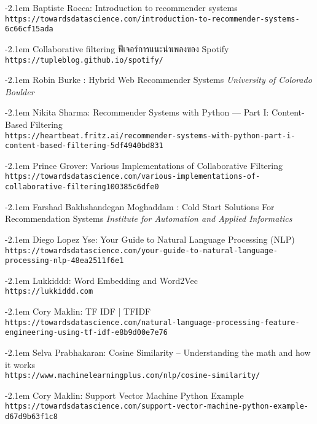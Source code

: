 \documentclass{itkmitlcoop}
\makeatletter
\def\bibindent{2.1em}
\let\old@bibitem\bibitem
\def\bibitem#1{\old@bibitem{#1}\leavevmode\kern-\bibindent}
\makeatother
\begin{document}
\begin{thebibliography}{9}
  
  Baptiste Rocca: Introduction to recommender systems
  \\\texttt{https://towardsdatascience.com/introduction-to-recommender-systems-6c66cf15ada}

  Collaborative filtering ฟีเจอร์การแนะนำเพลงของ Spotify
  \\\texttt{https://tupleblog.github.io/spotify/}  

  Robin Burke : Hybrid Web Recommender Systems
  \textit{University of Colorado Boulder}

  Nikita Sharma: Recommender Systems with Python — Part I: Content-Based Filtering
  \\\texttt{https://heartbeat.fritz.ai/recommender-systems-with-python-part-i-content-based-filtering-5df4940bd831}

  Prince Grover: Various Implementations of Collaborative Filtering
  \\\texttt{https://towardsdatascience.com/various-implementations-of-collaborative-filtering100385c6dfe0}

  Farshad Bakhshandegan Moghaddam : Cold Start Solutions For Recommendation Systems
  \textit{Institute for Automation and Applied Informatics}

  Diego Lopez Yse: Your Guide to Natural Language Processing (NLP)
  \\\texttt{https://towardsdatascience.com/your-guide-to-natural-language-processing-nlp-48ea2511f6e1}
  
  Lukkiddd: Word Embedding and Word2Vec
  \\\texttt{https://lukkiddd.com}

  Cory Maklin: TF IDF | TFIDF 
  \\\texttt{https://towardsdatascience.com/natural-language-processing-feature-engineering-using-tf-idf-e8b9d00e7e76}
  
  Selva Prabhakaran: Cosine Similarity – Understanding the math and how it works
  \\\texttt{https://www.machinelearningplus.com/nlp/cosine-similarity/}

  Cory Maklin: Support Vector Machine Python Example
  \\\texttt{https://towardsdatascience.com/support-vector-machine-python-example-d67d9b63f1c8}


\end{thebibliography}
\end{document}
